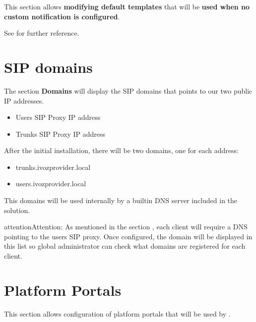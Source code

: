 \documentclass[letterpaper,10pt,english]{sphinxmanual}
\begin{document}
This section allows \textbf{modifying default templates} that will be \textbf{used when no custom notification is configured}.

See {\hyperref[administration_portal/brand/settings/notification_templates:notification\string-templates]{}} for further reference.


\section{SIP domains}
\label{administration_portal/platform/sip_domains:sip-domains}\label{administration_portal/platform/sip_domains::doc}\label{administration_portal/platform/sip_domains:god-sipdomains}
The section \textbf{Domains} will display the SIP domains that points to our two
public IP addresses.
\begin{itemize}
\item {} 
Users SIP Proxy IP address

\item {} 
Trunks SIP Proxy IP address

\end{itemize}

After the initial installation, there will be two domains, one for each address:
\begin{itemize}
\item {} 
trunks.ivozprovider.local

\item {} 
users.ivozprovider.local

\end{itemize}

This domains will be used internally by a builtin DNS server included in the
solution.

\begin{notice}{attention}{Attention:}
As mentioned in the section {\hyperref[getting_started/internal_calls/brand_portal:domain\string-per\string-client]{}}, each
client will require a DNS pointing to the users SIP proxy. Once configured,
the domain will be displayed in this list so global administrator can check
what domains are registered for each client.
\end{notice}


\section{Platform Portals}
\label{administration_portal/platform/portals:portals}\label{administration_portal/platform/portals:platform-portals}\label{administration_portal/platform/portals::doc}
This section allows configuration of platform portals that will be used by {\hyperref[administration_portal/platform/main_operators:main\string-operators]{}}.
\end{document}
